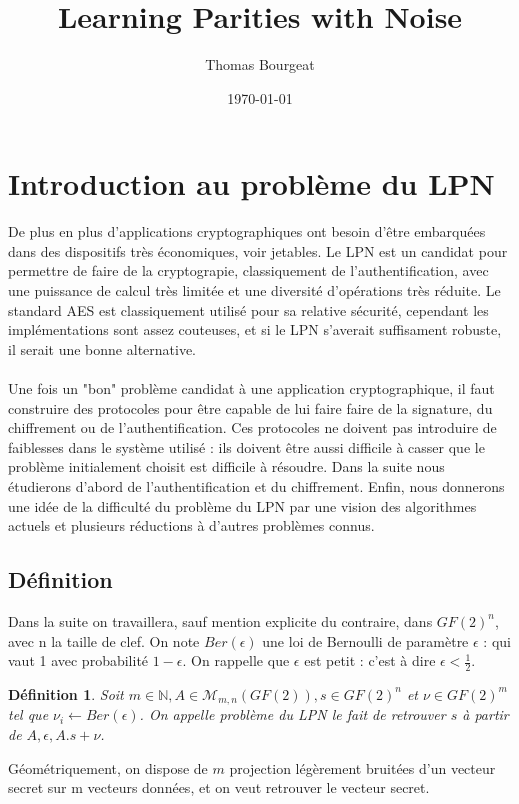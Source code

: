 \documentclass{article}		%
\newtheorem{defi}{Définition}
\theoremstyle{definition}
\theoremstyle{plain}
\begin{document}
\title{Learning Parities with Noise}
\author{Thomas Bourgeat }
\date\today
\maketitle
\section{Introduction au problème du LPN}
De plus en plus d'applications cryptographiques ont besoin d'être embarquées 
dans des dispositifs très économiques, voir jetables.  Le LPN est un candidat
pour permettre de faire de la cryptograpie, classiquement de
l'authentification, avec une puissance de calcul
très limitée et une diversité d'opérations très réduite.
Le standard AES est classiquement utilisé pour sa relative sécurité,
cependant les implémentations sont assez couteuses, et si le LPN s'averait suffisament
robuste, il serait une bonne alternative.
\\\\
Une fois un "bon" problème candidat à une application cryptographique, il
faut construire des protocoles pour être capable de lui faire faire de la
signature, du chiffrement ou de l'authentification. Ces protocoles ne
doivent pas introduire de faiblesses dans le système utilisé : ils doivent
être aussi difficile à casser que le problème initialement choisit est
difficile à résoudre.
Dans la suite nous  étudierons d'abord de l'authentification et du
chiffrement. Enfin, nous donnerons une idée de la difficulté du
problème du LPN par une vision des algorithmes actuels et plusieurs
réductions à d'autres problèmes connus.    
\subsection{Définition}
Dans la suite on travaillera, sauf mention explicite du contraire, dans
$GF(2)^n$, avec n la taille de clef. On note $Ber(\epsilon)$
une loi de Bernoulli de paramètre $\epsilon$ : qui vaut 1 avec
probabilité $1-\epsilon$. On rappelle que $\epsilon$ est petit : c'est à
dire $\epsilon < \frac {1}{2}$.  
\begin{defi}
Soit $m \in \mathbb{N}, A \in \mathcal{M}_{m,n}(GF(2)), s \in GF(2)^n$ et
$\nu \in GF(2)^m$ tel que $\nu_i \leftarrow Ber(\epsilon)$. On appelle
problème du LPN le fait de retrouver $s$ à partir de $A,\epsilon,
A.s+\nu$. 
\end{defi}
Géométriquement, on dispose de $m$ projection légèrement bruitées d'un vecteur secret sur m
vecteurs données, et on veut retrouver le vecteur secret.
\end{document}
